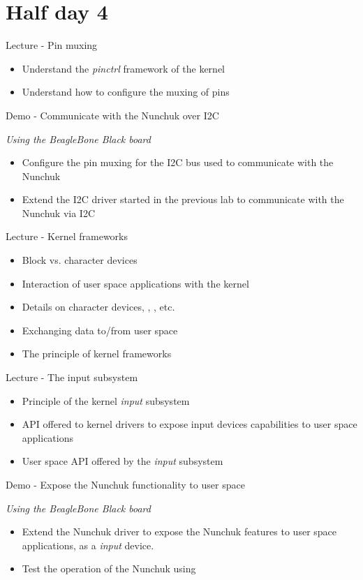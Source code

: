 \documentclass[a4paper,12pt,obeyspaces,spaces,hyphens]{article}
\begin{document}
\section{Half day 4}
\feagendatwocolumn
{Lecture - Pin muxing}
{
  \begin{itemize}
  \item Understand the {\em pinctrl} framework of the kernel
  \item Understand how to configure the muxing of pins
  \end{itemize}
}
{Demo - Communicate with the Nunchuk over I2C}
{
  {\em Using the BeagleBone Black board}
  \begin{itemize}
  \item Configure the pin muxing for the I2C bus used to communicate
    with the Nunchuk
  \item Extend the I2C driver started in the previous lab to
    communicate with the Nunchuk via I2C
  \end{itemize}
}

\feagendatwocolumn
{Lecture - Kernel frameworks}
{
  \begin{itemize}
  \item Block vs. character devices
  \item Interaction of user space applications with the kernel
  \item Details on character devices, , , etc.
  \item Exchanging data to/from user space
  \item The principle of kernel frameworks
  \end{itemize}
}
{Lecture - The input subsystem}
{
  \begin{itemize}
  \item Principle of the kernel {\em input} subsystem
  \item API offered to kernel drivers to expose input devices
    capabilities to user space applications
  \item User space API offered by the {\em input} subsystem
  \end{itemize}
}

\feagendaonecolumn
{Demo - Expose the Nunchuk functionality to user space}
{
  {\em Using the BeagleBone Black board}
  \begin{itemize}
  \item Extend the Nunchuk driver to expose the Nunchuk features to
    user space applications, as a {\em input} device.
  \item Test the operation of the Nunchuk using 
  \end{itemize}
}
\end{document}
